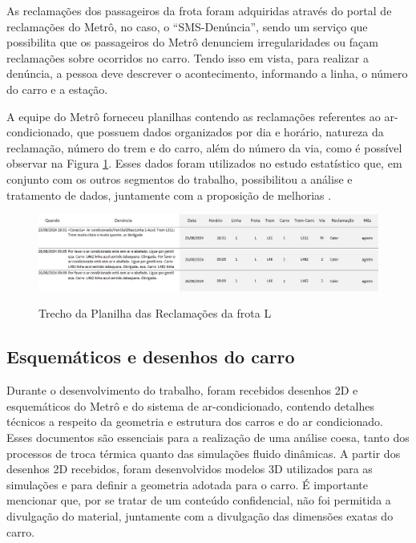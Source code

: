 \documentclass[acronym,symbols,table]{fei}
\begin{document}
    As reclamações dos passageiros da frota foram adquiridas através do portal de reclamações do Metrô, no caso, o “SMS-Denúncia”, sendo um serviço que possibilita que os passageiros do Metrô denunciem irregularidades ou façam reclamações sobre ocorridos no carro. Tendo isso em vista, para realizar a denúncia, a pessoa deve descrever o acontecimento, informando a linha, o número do carro e a estação. 
    
    A equipe do Metrô forneceu planilhas contendo as reclamações referentes ao ar-condicionado, que possuem dados organizados por dia e horário, natureza da reclamação, número do trem e do carro, além do número da via, como é possível observar na Figura \ref{fig:SMS_Denuncia}. Esses dados foram utilizados no estudo estatístico que, em conjunto com os outros segmentos do trabalho, possibilitou a análise e tratamento de dados, juntamente com a proposição de melhorias \cite{metrosp2024}.
    
\begin{figure}[!htb]
    \centering
    \caption{Trecho da Planilha das Reclamações da frota L}
    \includegraphics[width=1.0\linewidth]{Imagens/SMS_Denuncia.png}
    \label{fig:SMS_Denuncia}
\end{figure}


\subsection{Esquemáticos e desenhos do carro} 
    
Durante o desenvolvimento do trabalho, foram recebidos desenhos 2D e esquemáticos do Metrô e do sistema de ar-condicionado, contendo detalhes técnicos a respeito da geometria e estrutura dos carros e do ar condicionado. Esses documentos são essenciais para a realização de uma análise coesa, tanto dos processos de troca térmica quanto das simulações fluido dinâmicas. A partir dos desenhos 2D recebidos, foram desenvolvidos modelos 3D utilizados para as simulações e para definir a geometria adotada para o carro. É importante mencionar que, por se tratar de um conteúdo confidencial, não foi permitida a divulgação do material, juntamente com a divulgação das dimensões exatas do carro.
 
\end{document}
